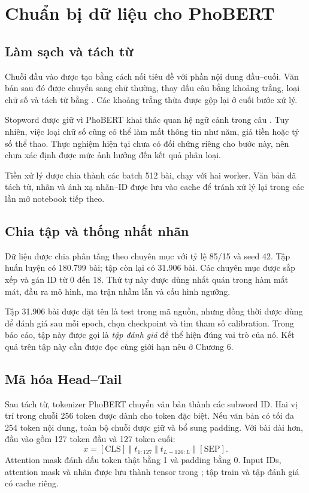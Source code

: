 \chapter{Chuẩn bị dữ liệu cho PhoBERT}
\section{Làm sạch và tách từ}
Chuỗi đầu vào được tạo bằng cách nối tiêu đề với phần nội dung đầu--cuối. Văn bản sau đó được chuyển sang chữ thường, thay dấu câu bằng khoảng trắng, loại chữ số và tách từ bằng . Các khoảng trắng thừa được gộp lại ở cuối bước xử lý.

Stopword được giữ vì PhoBERT khai thác quan hệ ngữ cảnh trong câu \cite{phobert,pyvi}. Tuy nhiên, việc loại chữ số cũng có thể làm mất thông tin như năm, giá tiền hoặc tỷ số thể thao. Thực nghiệm hiện tại chưa có đối chứng riêng cho bước này, nên chưa xác định được mức ảnh hưởng đến kết quả phân loại.

Tiền xử lý được chia thành các batch 512 bài, chạy với hai worker. Văn bản đã tách từ, nhãn và ánh xạ nhãn--ID được lưu vào cache để tránh xử lý lại trong các lần mở notebook tiếp theo.

\section{Chia tập và thống nhất nhãn}
Dữ liệu được chia phân tầng theo chuyên mục với tỷ lệ 85/15 và seed 42. Tập huấn luyện có 180.799 bài; tập còn lại có 31.906 bài. Các chuyên mục được sắp xếp và gán ID từ 0 đến 18. Thứ tự này được dùng nhất quán trong hàm mất mát, đầu ra mô hình, ma trận nhầm lẫn và cấu hình ngưỡng.

Tập 31.906 bài được đặt tên là test trong mã nguồn, nhưng đồng thời được dùng để đánh giá sau mỗi epoch, chọn checkpoint và tìm tham số calibration. Trong báo cáo, tập này được gọi là \emph{tập đánh giá} để thể hiện đúng vai trò của nó. Kết quả trên tập này cần được đọc cùng giới hạn nêu ở Chương 6.

\section{Mã hóa Head--Tail}
Sau tách từ, tokenizer PhoBERT chuyển văn bản thành các subword ID. Hai vị trí trong chuỗi 256 token được dành cho token đặc biệt. Nếu văn bản có tối đa 254 token nội dung, toàn bộ chuỗi được giữ và bổ sung padding. Với bài dài hơn, đầu vào gồm 127 token đầu và 127 token cuối:
\[
x=[\mathrm{CLS}]\;\Vert\;t_{1:127}\;\Vert\;t_{L-126:L}\;\Vert\;[\mathrm{SEP}].
\]
Attention mask đánh dấu token thật bằng 1 và padding bằng 0. Input IDs, attention mask và nhãn được lưu thành tensor trong ; tập train và tập đánh giá có cache riêng.

